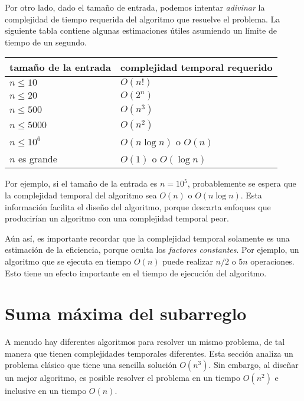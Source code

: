 Por otro lado, dado el tamaño de entrada,
podemos intentar \emph{adivinar}
la complejidad de tiempo requerida del algoritmo
que resuelve el problema.
La siguiente tabla contiene algunas estimaciones útiles
asumiendo un límite de tiempo de un segundo.

\begin{center}
\begin{tabular}{ll}
tamaño de la entrada & complejidad temporal requerido \\
\hline
$n \le 10$ & $O(n!)$ \\
$n \le 20$ & $O(2^n)$ \\
$n \le 500$ & $O(n^3)$ \\
$n \le 5000$ & $O(n^2)$ \\
$n \le 10^6$ & $O(n \log n)$ o $O(n)$ \\
$n$ es grande & $O(1)$ o $O(\log n)$ \\
\end{tabular}
\end{center}

Por ejemplo, si el tamaño de la entrada es $n=10^5$,
probablemente se espera que la complejidad
temporal del algoritmo sea $O(n)$ o $O(n \log n)$.
Esta información facilita el diseño del algoritmo,
porque descarta enfoques que producirían
un algoritmo con una complejidad temporal peor.


Aún así, es importante recordar que
la complejidad temporal solamente es una estimación de la eficiencia,
porque oculta los \emph{factores constantes}.
Por ejemplo, un algoritmo que se ejecuta en tiempo $O(n)$
puede realizar $n/2$ o $5n$ operaciones.
Esto tiene un efecto importante en el
tiempo de ejecución del algoritmo.

\section{Suma máxima del subarreglo}


A menudo hay diferentes algoritmos
para resolver un mismo problema, de tal manera que tienen
complejidades temporales diferentes.
Esta sección analiza un problema clásico que
tiene una sencilla solución $O(n^3)$.
Sin embargo, al diseñar un mejor algoritmo,
es posible resolver el problema en un tiempo $O(n^2)$
e inclusive en un tiempo $O(n)$.

